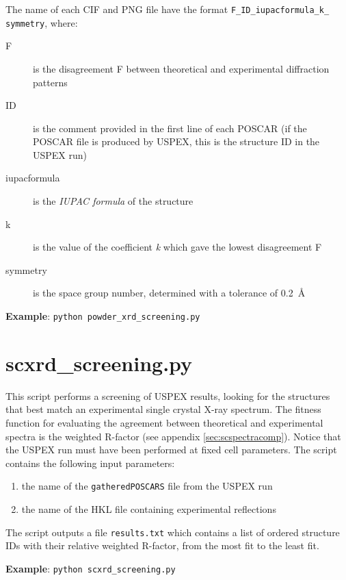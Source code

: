 \documentclass{article}
\begin{document}
The name of each CIF and PNG file have the format \texttt{F\_ID\_iupacformula\_k\_ \\ symmetry}, where:
\begin{description}
	\item[F] is the disagreement F between theoretical and experimental diffraction patterns
	\item[ID] is the comment provided in the first line of each POSCAR (if the POSCAR file is produced by USPEX, this is the structure ID in the USPEX run)
	\item[iupacformula] is the \emph{IUPAC formula} of the structure
	\item[k] is the value of the coefficient \emph{k} which gave the lowest disagreement F
	\item[symmetry] is the space group number, determined with a tolerance of 0.2~\AA
\end{description}
\textbf{Example}: \texttt{python powder\_xrd\_screening.py}

\section{scxrd\_screening.py}
This script performs a screening of USPEX results, looking for the structures that best match an experimental single crystal X-ray spectrum. The fitness function for evaluating the agreement between theoretical and experimental spectra is the weighted R-factor (see appendix \ref{sec:scspectracomp}). Notice that the USPEX run must have been performed at fixed cell parameters. The script contains the following input parameters:
\begin{enumerate}
	\item the name of the \texttt{gatheredPOSCARS} file from the USPEX run
	\item the name of the HKL file containing experimental reflections
\end{enumerate}
The script outputs a file \texttt{results.txt} which contains a list of ordered structure IDs with their relative weighted R-factor, from the most fit to the least fit.

\noindent \textbf{Example}: \texttt{python scxrd\_screening.py}
\end{document}
